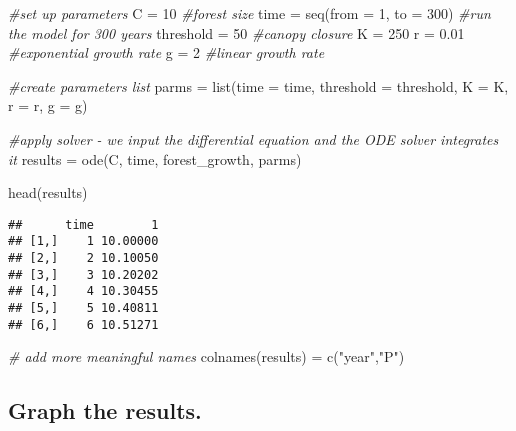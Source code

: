 \documentclass[
]{article}
\newenvironment{Shaded}{\begin{snugshade}}{\end{snugshade}}
\newcommand{\AttributeTok}[1]{\textcolor[rgb]{0.77,0.63,0.00}{#1}}
\newcommand{\CommentTok}[1]{\textcolor[rgb]{0.56,0.35,0.01}{\textit{#1}}}
\newcommand{\DecValTok}[1]{\textcolor[rgb]{0.00,0.00,0.81}{#1}}
\newcommand{\FloatTok}[1]{\textcolor[rgb]{0.00,0.00,0.81}{#1}}
\newcommand{\FunctionTok}[1]{\textcolor[rgb]{0.00,0.00,0.00}{#1}}
\newcommand{\NormalTok}[1]{#1}
\newcommand{\OtherTok}[1]{\textcolor[rgb]{0.56,0.35,0.01}{#1}}
\newcommand{\StringTok}[1]{\textcolor[rgb]{0.31,0.60,0.02}{#1}}
\begin{document}
\begin{Shaded}
\begin{Highlighting}[]
\CommentTok{\#set up parameters }
\NormalTok{C }\OtherTok{=} \DecValTok{10} \CommentTok{\#forest size}
\NormalTok{time }\OtherTok{=} \FunctionTok{seq}\NormalTok{(}\AttributeTok{from =} \DecValTok{1}\NormalTok{, }\AttributeTok{to =} \DecValTok{300}\NormalTok{) }\CommentTok{\#run the model for 300 years}
\NormalTok{threshold }\OtherTok{=} \DecValTok{50} \CommentTok{\#canopy closure }
\NormalTok{K }\OtherTok{=} \DecValTok{250}
\NormalTok{r }\OtherTok{=} \FloatTok{0.01} \CommentTok{\#exponential growth rate}
\NormalTok{g }\OtherTok{=} \DecValTok{2} \CommentTok{\#linear growth rate }

\CommentTok{\#create parameters list}
\NormalTok{parms }\OtherTok{=} \FunctionTok{list}\NormalTok{(}\AttributeTok{time =}\NormalTok{ time,}
             \AttributeTok{threshold =}\NormalTok{ threshold,}
             \AttributeTok{K =}\NormalTok{ K,}
             \AttributeTok{r =}\NormalTok{ r,}
             \AttributeTok{g =}\NormalTok{ g)}

\CommentTok{\#apply solver {-} we input the differential equation and the ODE solver integrates it }
\NormalTok{results }\OtherTok{=} \FunctionTok{ode}\NormalTok{(C, time, forest\_growth, parms)}

\FunctionTok{head}\NormalTok{(results)}
\end{Highlighting}
\end{Shaded}

\begin{verbatim}
##      time        1
## [1,]    1 10.00000
## [2,]    2 10.10050
## [3,]    3 10.20202
## [4,]    4 10.30455
## [5,]    5 10.40811
## [6,]    6 10.51271
\end{verbatim}

\begin{Shaded}
\begin{Highlighting}[]
\CommentTok{\# add more meaningful names}
\FunctionTok{colnames}\NormalTok{(results) }\OtherTok{=} \FunctionTok{c}\NormalTok{(}\StringTok{"year"}\NormalTok{,}\StringTok{"P"}\NormalTok{)}
\end{Highlighting}
\end{Shaded}

\hypertarget{graph-the-results.}{%
\subsection{Graph the results.}\label{graph-the-results.}}
\end{document}
